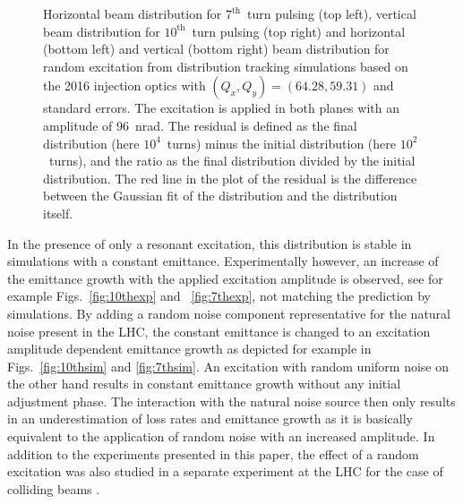 \documentclass[%
 reprint,
 amsmath,amssymb,
 aps,
prstab,
]{revtex4-1}
\begin{document}
\begin{figure}[t]
\begin{minipage}[t]{0.49\linewidth}
	\end{minipage}	
	\caption{\label{fig:patternhist} Horizontal beam distribution for $7^{\mathrm{th}}$~turn pulsing (top left), vertical beam distribution for $10^{\mathrm{th}}$~turn pulsing (top right) and horizontal (bottom left) and vertical (bottom right) beam distribution for random excitation from distribution tracking simulations based on the 2016 injection optics with $(Q_x,Q_y)=(64.28,59.31)$ and standard errors. The excitation is applied in both planes with an amplitude of 96~nrad. The residual is defined as the final distribution (here $10^4$~turns) minus the initial distribution (here $10^2$~turns), and the ratio as the final distribution divided by the initial distribution. The red line in the plot of the residual is the difference between the Gaussian fit of the distribution and the distribution itself.}
\end{figure}

In the presence of only a resonant excitation, this distribution is stable in simulations with a constant emittance. Experimentally however, an increase of the emittance growth with the applied excitation amplitude is observed, see for example Figs.~\ref{fig:10thexp} and ~\ref{fig:7thexp}, not matching the prediction by simulations. By adding a random noise component representative for the natural noise present in the LHC, the constant emittance is changed to an excitation amplitude dependent emittance growth as depicted for example in Figs.~\ref{fig:10thsim} and \ref{fig:7thsim}. An excitation with random uniform noise on the other hand results in constant emittance growth without any initial adjustment phase. The interaction with the natural noise source then only results in an underestimation of loss rates and emittance growth as it is basically equivalent to the application of random noise with an increased amplitude. In addition to the experiments presented in this paper, the effect of a random excitation was also studied in a separate experiment at the LHC for the case of colliding beams \cite{md1433_noise_top_energy,md_noise_bbLHC}.
\end{document}
